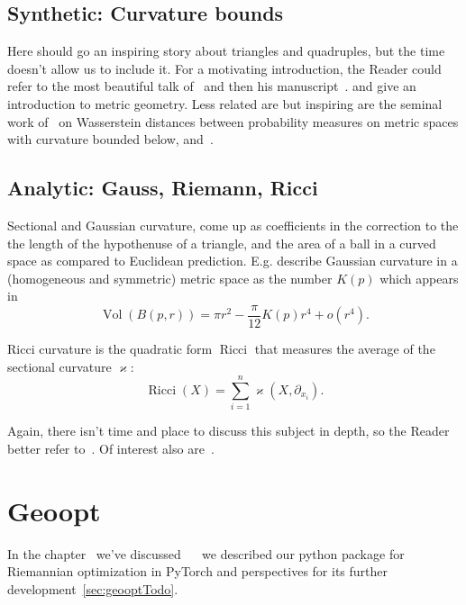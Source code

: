 \subsection*{Synthetic: Curvature bounds}

Here should go an inspiring story about triangles and quadruples, but the time
doesn't allow us to include it.
For a motivating introduction, the Reader could refer to the most beautiful
talk of~\citet{villaniTriangles} and then his manuscript~\cite{villaniOldNew}.
\citet{burago} and \citet{alexander} give an introduction to metric geometry.
Less related are but inspiring are the seminal work of~\citet{sturm} on Wasserstein
distances between probability measures on metric spaces with curvature bounded
below, and~\citet{le2017existence}.

\subsection*{Analytic: Gauss, Riemann, Ricci}

Sectional and Gaussian curvature, come up as coefficients in the correction to
the the length of the hypothenuse of a triangle, and the area of a ball in a
curved space as compared to Euclidean prediction.
E.g. \citet{burago} describe Gaussian curvature in a (homogeneous and
symmetric) metric space as the number \( K(p) \) which appears in
\[ \operatorname{Vol}(B(p, r)) = \pi r^2 - \frac{\pi}{12}K(p) r^4 + o(r^4). \]

Ricci curvature is the quadratic form \( \operatorname{Ricci} \) that measures
the average of the sectional curvature \( \varkappa \):
\[ \operatorname{Ricci}(X) = \sum_{i=1}^n \varkappa(X, \partial_{x_i}). \]

Again, there isn't time and place to discuss this subject in depth, so the
Reader better refer to~\citet{leeRiem}.  Of interest also
are~\citet{feyCurv,gravityLight,burago}.

\section{Geoopt}

In the chapter~ we've discussed
~~\cite{geoopt} we described our python package for
Riemannian optimization in PyTorch and perspectives for its further
development~\autoref{sec:geooptTodo}.
